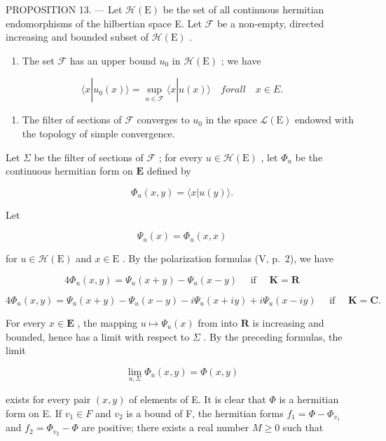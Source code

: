 PROPOSITION 13. --- Let \(\mathcal{H}(\mathrm{E})\) be the set of all continuous hermitian endomorphisms of the hilbertian space E. Let \(\mathcal{F}\) be a non-empty, directed increasing and bounded subset of \(\mathcal{H}(\mathrm{E})\) .

\begin{enumerate}
\def\labelenumi{(\roman{enumi})}
\tightlist
\item
  The set \(\mathcal{F}\) has an upper bound \(u_0\) in \(\mathcal{H}(\mathrm{E})\) ; we have
\end{enumerate}

\[
\langle x | u _ {0} (x) \rangle = \sup _ {u \in \mathcal {F}} \langle x | u (x) \rangle \quad f o r a l l \quad x \in E.\tag{18}
\]

\begin{enumerate}
\def\labelenumi{(\roman{enumi})}
\setcounter{enumi}{1}
\tightlist
\item
  The filter of sections of \(\mathcal{F}\) converges to \(u_0\) in the space \(\mathcal{L}(\mathrm{E})\) endowed with the topology of simple convergence.
\end{enumerate}

Let \(\Sigma\) be the filter of sections of \(\mathcal{F}\) ; for every \(u \in \mathcal{H}(\mathrm{E})\) , let \(\Phi_u\) be the continuous hermitian form on \(\mathbf{E}\) defined by

\[
\Phi_ {u} (x, y) = \langle x | u (y) \rangle .
\]

Let

\[
\Psi_ {u} (x) = \Phi_ {u} (x, x)
\]

for \(u \in \mathcal{H}(\mathrm{E})\) and \(x \in \mathrm{E}\) . By the polarization formulas (V, p.~2), we have

\[
4 \Phi_ {u} (x, y) = \Psi_ {u} (x + y) - \Psi_ {u} (x - y) \quad \text { if } \quad \mathbf {K} = \mathbf {R}\tag{19}
\]

\[
4 \Phi_ {u} (x, y) = \Psi_ {u} (x + y) - \Psi_ {u} (x - y) - i \Psi_ {u} (x + i y) + i \Psi_ {u} (x - i y) \quad \text { if } \quad \mathbf {K} = \mathbf {C}.\tag{20}
\]

For every \(x \in \mathbf{E}\) , the mapping \(u \mapsto \Psi_u(x)\) from into \(\mathbf{R}\) is increasing and bounded, hence has a limit with respect to \(\Sigma\) . By the preceding formulas, the limit

\[
\lim _ {u, \Sigma} \Phi_ {u} (x, y) = \Phi (x, y)
\]

exists for every pair \((x, y)\) of elements of E. It is clear that \(\Phi\) is a hermitian form on E. If \(v_{1} \in F\) and \(v_{2}\) is a bound of F, the hermitian forms \(f_{1} = \Phi - \Phi_{v_{1}}\) and \(f_{2} = \Phi_{v_{2}} - \Phi\) are positive; there exists a real number \(M \geqslant 0\) such that

